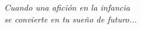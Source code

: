 \vspace*{\fill}
\begin{flushright}
	\textit{Cuando una afición en la infancia\\se convierte en tu sueño de futuro...}
\end{flushright}
\vspace*{\fill}